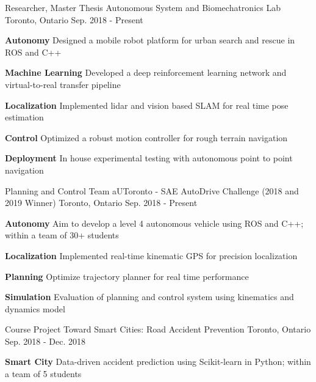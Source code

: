 \begin{cventries}
	\cventry
	{Researcher, Master Thesis}
	{Autonomous System and Biomechatronics Lab}
	{Toronto, Ontario}
	{Sep. 2018 - Present}
	{
		\begin{cvitems}
			\item {
				\textbf{Autonomy} Designed a mobile robot platform for urban search and rescue in ROS and C++
			}
			\item {
				\textbf{Machine Learning} Developed a deep reinforcement learning network and virtual-to-real transfer pipeline
			}
			\item {
				\textbf{Localization} Implemented lidar and vision based SLAM for real time pose estimation
			}
			\item {
				\textbf{Control} Optimized a robust motion controller for rough terrain navigation
			}
			\item {
				\textbf{Deployment} In house experimental testing with autonomous point to point navigation
			}
		\end{cvitems}
	}
	\cventry
	{Planning and Control Team}
	{aUToronto - SAE AutoDrive Challenge (2018 and 2019 Winner)}
	{Toronto, Ontario}
	{Sep. 2018 - Present}
	{
		\begin{cvitems}
			\item {\textbf{Autonomy} Aim to develop a level 4 autonomous vehicle using ROS and C++; within a team of 30+ students}
			\item {\textbf{Localization} Implemented real-time kinematic GPS for precision localization
			}
			\item {\textbf{Planning} Optimize trajectory planner for real time performance		
			}
			\item {\textbf{Simulation} Evaluation of planning and control system using kinematics and dynamics model
			}
		\end{cvitems}
	}	
	\cventry
	{Course Project}
	{Toward Smart Cities: Road Accident Prevention}
	{Toronto, Ontario}
	{Sep. 2018 - Dec. 2018}
	{
		\begin{cvitems}
			\item {\textbf{Smart City} Data-driven accident prediction using Scikit-learn in Python; within a team of 5 students}

\end{cvitems}}
\end{cventries}
